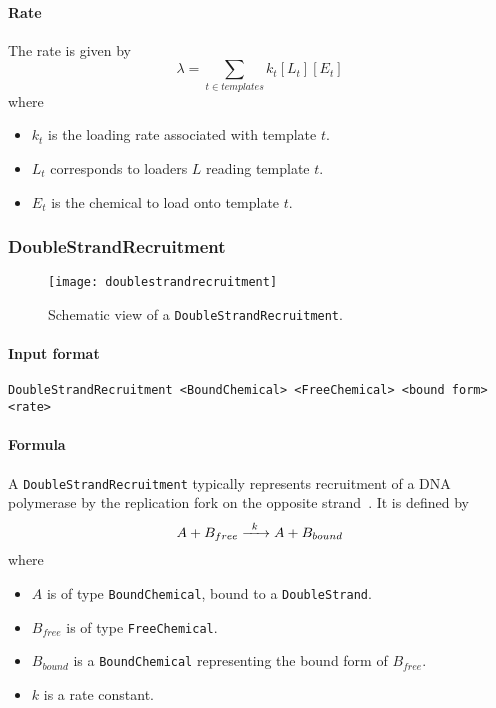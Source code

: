 \paragraph{Rate} The rate is given by
\[
\lambda = \sum_{t\in templates} k_t[L_t][E_t]
\]
where
\begin{itemize}
	\item $k_t$ is the loading rate associated with template $t$.
	\item $L_t$ corresponds to loaders $L$ reading template $t$.
	\item $E_t$ is the chemical to load onto template $t$.
\end{itemize}

\subsubsection{DoubleStrandRecruitment}

\begin{figure}[!h]
  \centering
  \texttt{[image: doublestrandrecruitment]}
  \caption{Schematic view of a \texttt{DoubleStrandRecruitment}.}
  \label{fig:double_strand_recruitment}
\end{figure}

\paragraph{Input format}
\begin{verbatim}
DoubleStrandRecruitment <BoundChemical> <FreeChemical> <bound form> <rate>
\end{verbatim}

\paragraph{Formula} A \texttt{DoubleStrandRecruitment} typically represents recruitment of a DNA polymerase by the replication fork on the opposite strand~. It is defined by
\[
\reactionIrr{A + B_{free}}{A + B_{bound}}{k}{}
\]
where
\begin{itemize}
  \item $A$ is of type \texttt{BoundChemical}, bound to a \texttt{DoubleStrand}.
  \item $B_{free}$ is of type \texttt{FreeChemical}.
  \item $B_{bound}$ is a \texttt{BoundChemical} representing the bound form of $B_{free}$.
  \item $k$ is a rate constant.
\end{itemize}

